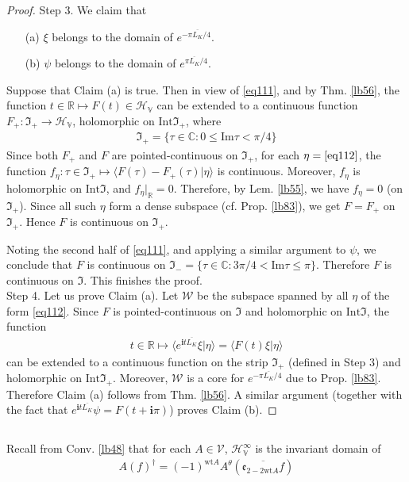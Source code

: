 \documentclass[12pt,b5paper,notitlepage]{article}
\theoremstyle{definition}
\theoremstyle{plain}
\newcommand{\fk}{\mathfrak}
\newcommand{\mc}{\mathcal}
\newcommand{\ovl}{\overline}
\newcommand{\bk}[1]{\langle {#1}\rangle}
\newcommand{\im}{\mathbf{i}}
\newcommand{\Cbb}{\mathbb C}
\newcommand{\Rbb}{\mathbb R}
\newcommand{\wt}{\mathrm{wt}}
\newcommand{\Imag}{\mathrm{Im}}
\newcommand{\Int}{\mathrm{Int}}
\newcommand{\HV}{\mathcal H_{\mathbb V}}
\newcommand{\ek}{\mathfrak{e}}
\newcommand{\MV}{\mathcal V}
\numberwithin{equation}{section}
\begin{document}
\begin{proof}
Step 3. We claim that 
\begin{enumerate}
\item[(a)] $\xi$ belongs to the domain of  $e^{-\pi\ovl{L_K}/4}$.
\item[(b)] $\psi$ belongs to the domain of $e^{\pi\ovl{L_K}/4}$.
\end{enumerate}
Suppose that Claim (a) is true. Then in view of \eqref{eq111}, and by Thm. \ref{lb56}, the function $t\in\Rbb\mapsto F(t)\in\HV$ can be extended to a continuous function $F_+:\fk I_+\rightarrow\HV$, holomorphic on $\Int\fk I_+$, where
\begin{align*}
\fk I_+=\{\tau\in\Cbb:0\leq\Imag\tau<\pi/4\}
\end{align*}
Since both $F_+$ and $F$ are pointed-continuous on $\fk I_+$, for each $\eta=\eqref{eq112}$, the function $f_\eta:\tau\in\fk I_+\mapsto\bk{F(\tau)-F_+(\tau)|\eta}$ is continuous. Moreover, $f_\eta$ is holomorphic on $\Int\fk I$, and $f_\eta|_\Rbb=0$. Therefore, by Lem. \ref{lb55}, we have $f_\eta=0$ (on $\fk I_+$). Since all such $\eta$ form a dense subspace (cf. Prop. \ref{lb83}), we get $F=F_+$ on $\fk I_+$. Hence $F$ is continuous on $\fk I_+$.

Noting the second half of \eqref{eq111}, and applying a similar argument to $\psi$, we conclude that $F$ is continuous on $\fk I_-=\{\tau\in\Cbb:3\pi/4<\Imag\tau\leq\pi\}$. Therefore $F$ is continuous on $\fk I$. This finishes the proof.\\[-1ex]

Step 4. Let us prove Claim (a). Let $\mc W$ be the subspace spanned by all $\eta$ of the form \eqref{eq112}. Since $F$ is pointed-continuous on $\fk I$ and holomorphic on $\Int\fk I$, the function
\begin{align*}
t\in\Rbb\mapsto\bk{e^{\im t\ovl{L_K}}\xi|\eta}=\bk{F(t)\xi|\eta}
\end{align*}
can be extended to a continuous function on the strip $\fk I_+$ (defined in Step 3) and holomorphic on $\Int\fk I_+$. Moreover, $\mc W$ is a core for $e^{-\pi\ovl{L_K}/4}$ due to Prop. \ref{lb83}. Therefore Claim (a) follows from Thm. \ref{lb56}. A similar argument (together with the fact that $e^{\im t\ovl{L_K}}\psi=F(t+\im\pi)$) proves Claim (b).
\end{proof}


\subsection{}


Recall from Conv. \ref{lb48} that for each $A\in\MV$, $\HV^\infty$ is the invariant domain of
\begin{align}\label{eq119}
A(f)^\dagger=(-1)^{\wt A}A^\theta(\ovl{\ek_{2-2\wt A}f})
\end{align}
\end{document}
